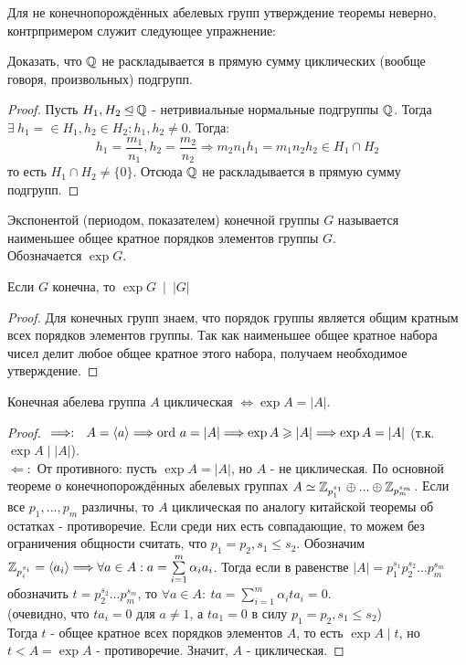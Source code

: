 \begin{remark}
    Для не конечнопорождённых абелевых групп утверждение теоремы неверно, контрпримером служит следующее упражнение:
\end{remark}
\begin{exercise}
    Доказать, что $\mathbb{Q}$ не раскладывается в прямую сумму циклических (вообще говоря, произвольных) подгрупп.
\end{exercise}
\begin{proof}
    Пусть $H_1, H_2 \unlhd \mathbb{Q}$ - нетривиальные нормальные подгруппы $\mathbb{Q}$. Тогда $\exists \ h_1 = \in H_1, h_2 \in H_2: h_1, h_2 \neq 0$. Тогда:
    \[h_1 = \frac{m_1}{n_1}, h_2 = \frac{m_2}{n_2} \Longrightarrow m_2n_1h_1 = m_1n_2h_2 \in H_1 \cap H_2\]
    то есть $H_1 \cap H_2 \neq \{0\}$. Отсюда $\mathbb{Q}$ не раскладывается в прямую сумму подгрупп.
\end{proof}
\begin{definition}
    Экспонентой (периодом, показателем) конечной группы $G$ называется наименьшее общее кратное порядков элементов группы $G$.\\
    Обозначается $\exp G$.
\end{definition}
\begin{subtheorem}
    Если $G$ конечна, то $\exp G \ \mid \ |G|$
\end{subtheorem}
\begin{proof}
    Для конечных групп знаем, что порядок группы является общим кратным всех порядков элементов группы. Так как наименьшее общее кратное набора чисел делит любое общее кратное этого набора, получаем необходимое утверждение. 
\end{proof}
\begin{subtheorem}
    Конечная абелева группа $A$ циклическая $\Longleftrightarrow \exp A = |A|$.
\end{subtheorem}
\begin{proof}
    $ \\ \Longrightarrow: \ \ A = \langle a \rangle \Longrightarrow \textup{ord } a = |A| \Longrightarrow \exp A \geqslant |A| \Longrightarrow \exp A = |A|$ (т.к. $\exp A \mid |A|$).\\
    $ \Longleftarrow:$ От противного: пусть $\exp A = |A|$, но $A$ - не циклическая. По основной теореме о конечнопорождённых абелевых группах $A \simeq \mathbb{Z}_{p_1^{s_1}} \oplus ... \oplus \mathbb{Z}_{p_m^{s_m}}$. Если все $p_1,...,p_m$ различны, то $A$ циклическая по аналогу китайской теоремы об остатках - противоречие. Если среди них есть совпадающие, то можем без ограничения общности считать, что $p_1 = p_2, s_1 \leqslant s_2$.
    Обозначим $\mathbb{Z}_{p_i^{s_i}} = \langle a_i \rangle \Longrightarrow \forall a \in A: a = \sum \limits_{i = 1}^m \alpha_ia_i$. Тогда если в равенстве $|A| = p_1^{s_1}p_2^{s_2}...p_m^{s_m}$ обозначить $t = p_2^{s_2}...p_m^{s_m}$, то $\forall a \in A: \ ta = \sum \limits_{i = 1}^m \alpha_ita_i = 0$. \\
    (очевидно, что $ta_i = 0$ для $a \neq 1$, а $ta_1 = 0$ в силу $p_1 = p_2, s_1 \leqslant s_2$)\\
    Тогда $t$ - общее кратное всех порядков элементов $A$, то есть $\exp A \mid t$, но $t < A = \exp A$ - противоречие. Значит, $A$ - циклическая.
\end{proof}
